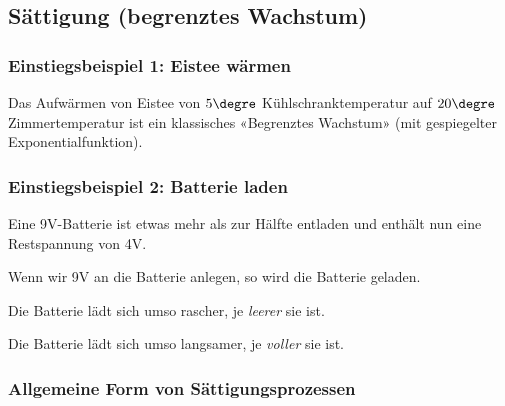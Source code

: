 \newpage


\subsection{Sättigung (begrenztes Wachstum)}
\subsubsection{Einstiegsbeispiel 1: Eistee wärmen}
Das Aufwärmen von Eistee von $5\degre$ Kühlschranktemperatur auf $20\degre$ Zimmertemperatur ist ein klassisches «Begrenztes Wachstum» (mit gespiegelter Exponentialfunktion).


\subsubsection{Einstiegsbeispiel 2: Batterie laden}
\begin{center}
\end{center}

Eine 9V-Batterie ist etwas mehr als zur Hälfte entladen und enthält nun eine
Restspannung von 4V.

Wenn wir 9V an die Batterie anlegen, so wird die Batterie geladen.

Die Batterie lädt sich umso rascher, je \textit{leerer} sie ist.

Die Batterie lädt sich umso langsamer, je \textit{voller} sie ist.


\newpage

\subsubsection{Allgemeine Form von Sättigungsprozessen}

\begin{center}
\end{center}

